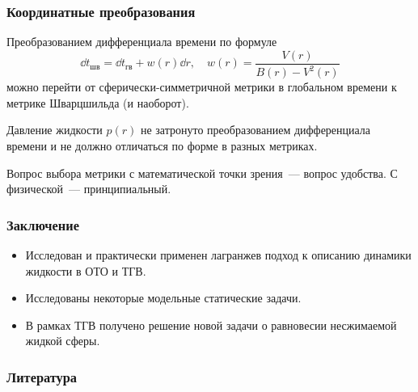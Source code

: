 \documentclass[compress]{beamer}
\def\docroot{../..}
\begin{document}

    \begin{frame}\frametitle{Координатные преобразования}

        Преобразованием дифференциала времени по формуле
        \begin{equation*}
            \dd{t}_\text{шв} = \dd{t}_\text{гв} + w(r) \dd{r}, \quad
            w(r) = \frac{V(r)}{B(r) - V^2(r)}
        \end{equation*}
        можно перейти от сферически-симметричной метрики в глобальном времени к метрике Шварцшильда (и наоборот).

        Давление жидкости $p(r)$ не затронуто преобразованием дифференциала времени и не должно отличаться по форме в разных метриках.

        Вопрос выбора метрики с математической точки зрения~--- вопрос удобства. С физической~--- принципиальный.

    \end{frame}


    \begin{frame}\frametitle{Заключение}

        \begin{itemize}
            \item Исследован и практически применен лагранжев подход к описанию динамики жидкости в ОТО и ТГВ.
            \item Исследованы некоторые модельные статические задачи.
            \item В рамках ТГВ получено решение новой задачи о равновесии несжимаемой жидкой сферы.
        \end{itemize}

    \end{frame}


    \begin{frame}\frametitle{Литература}

        {\tiny{
        
        
        }}

    \end{frame}
\end{document}
